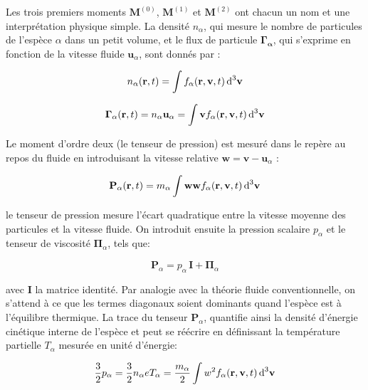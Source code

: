 \begin{refsection}
Les trois premiers moments $\mathbf M^{(0)}$, $\mathbf M^{(1)}$ et $\mathbf
M^{(2)}$ ont chacun un nom et une interprétation physique simple. La densité
$n_\alpha$, qui mesure le nombre de particules de l'espèce $\alpha$ dans un
petit volume, et le flux de particule $\boldsymbol{\Gamma_\alpha}$, qui
s'exprime en fonction de la vitesse fluide $\mathbf u_\alpha$, sont
donnés par :

\begin{equation}
n_\alpha(\mathbf
r,t)=\int f_\alpha(\mathbf r,\mathbf v,t)
\,\text{d}^{{3}}\mathbf{v}
\end{equation}

\begin{equation}
\boldsymbol{\Gamma}_\alpha(\mathbf
r,t)=n_\alpha\mathbf u_\alpha=\int \mathbf v f_\alpha(\mathbf r,\mathbf
v,t) \,\text{d}^{{3}}\mathbf{v}
\end{equation}

Le moment d'ordre deux (le tenseur de pression) est mesuré dans le repère au
repos du fluide en introduisant la vitesse relative $\mathbf w=\mathbf
v-\mathbf u_\alpha$ : 

\begin{equation}
\mathbf P_\alpha(\mathbf
r,t)=m_\alpha\int \mathbf w\mathbf w
f_\alpha(\mathbf r,\mathbf v,t) \,\text{d}^{{3}}\mathbf{v}
\end{equation}

le tenseur de pression mesure l'écart quadratique entre la vitesse moyenne des
particules et la vitesse fluide. On introduit ensuite la
pression scalaire $p_\alpha$ et le tenseur de viscosité
$\boldsymbol{\Pi}_\alpha$, tels que:

\begin{equation}
\label{1-tenseurPression}
\mathbf P_\alpha=p_\alpha\,\mathbf I + \boldsymbol{\Pi}_\alpha
\end{equation}

avec $\mathbf I$ la matrice identité. Par analogie avec la théorie fluide
conventionnelle, on s'attend à ce que les termes diagonaux soient dominants
quand l'espèce est à l'équilibre thermique. La trace du tenseur
$\mathbf P_\alpha$, quantifie ainsi la densité d'énergie cinétique
interne de l'espèce et peut se réécrire en définissant la température partielle 
$T_\alpha$ mesurée en unité d'énergie:

\begin{equation}
\frac{3}{2}p_\alpha=\frac{3}{2}n_\alpha eT_\alpha=\frac{m_\alpha}{2}\int 
w^{{2}} f_\alpha(\mathbf r,\mathbf v,t) \,\text{d}^{{3}}\mathbf{v}
\end{equation}


\end{refsection}
